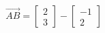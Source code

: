 \documentclass[preview]{standalone}
\begin{document}
\begin{align*}
\vec{AB} = \begin{bmatrix} 2 \\ 3 \end{bmatrix} - \begin{bmatrix} -1 \\ 2 \end{bmatrix}
\end{align*}
\end{document}
